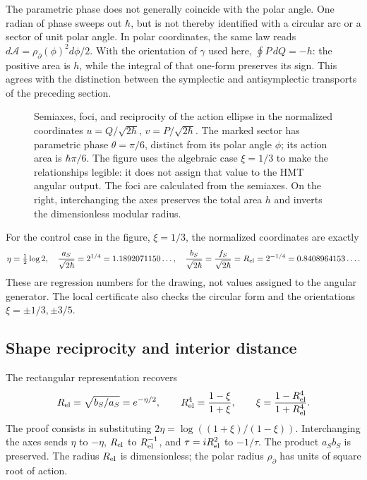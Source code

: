 The parametric phase does not generally coincide with the polar angle. One radian
of phase sweeps out \(\hbar\), but is not thereby identified with a circular
arc or a sector of unit polar angle. In polar coordinates,
the same law reads
\(d\mathcal A=\rho_{\partial}(\phi)^2d\phi/2\).
With the orientation of \(\gamma\) used here,
\(\oint P\,dQ=-h\): the positive area is \(h\), while the
integral of that one-form preserves its sign. This agrees with the
distinction between the symplectic and antisymplectic transports of the
preceding section.

\begin{figure}[htbp]
 \centering
 
 \caption{Semiaxes, foci, and reciprocity of the action ellipse in the
 normalized coordinates \(u=Q/\sqrt{2\hbar}\),
 \(v=P/\sqrt{2\hbar}\). The marked sector has parametric phase
 \(\theta=\pi/6\), distinct from its polar angle \(\phi\); its action
 area is \(\hbar\pi/6\). The figure uses the algebraic case
 \(\xi=1/3\) to make the relationships legible: it does not assign that value
 to the HMT angular output. The foci are calculated from the semiaxes.
 On the right, interchanging the axes preserves the total area \(h\)
 and inverts the dimensionless modular radius.}
 \label{fig:ii-elipse-calculada}
\end{figure}

For the control case in the figure, \(\xi=1/3\), the normalized
coordinates are exactly
\[
 \eta=\tfrac12\log2,\quad
 \frac{a_S}{\sqrt{2\hbar}}=2^{1/4}=1.1892071150\ldots,\quad
 \frac{b_S}{\sqrt{2\hbar}}=
 \frac{f_S}{\sqrt{2\hbar}}=R_{\rm el}=2^{-1/4}=0.8408964153\ldots.
\]
These are regression numbers for the drawing, not values assigned to the angular
generator. The local certificate also checks the circular form and the
orientations \(\xi=\pm1/3,\pm3/5\).

\subsection{Shape reciprocity and interior distance}

The rectangular representation recovers
\begin{equation}
 R_{\rm el}=\sqrt{b_S/a_S}=e^{-\eta/2},\qquad
 R_{\rm el}^4=\frac{1-\xi}{1+\xi},\qquad
 \xi=\frac{1-R_{\rm el}^4}{1+R_{\rm el}^4}.
 \label{eq:ii-elipse-reciproca}
\end{equation}
The proof consists in substituting
\(2\eta=\log((1+\xi)/(1-\xi))\). Interchanging the axes
sends \(\eta\) to \(-\eta\), \(R_{\rm el}\) to
\(R_{\rm el}^{-1}\), and \(\tau=iR_{\rm el}^2\) to \(-1/\tau\).
The product \(a_Sb_S\) is preserved. The radius \(R_{\rm el}\) is dimensionless;
the polar radius \(\rho_{\partial}\) has units of square root of action.

